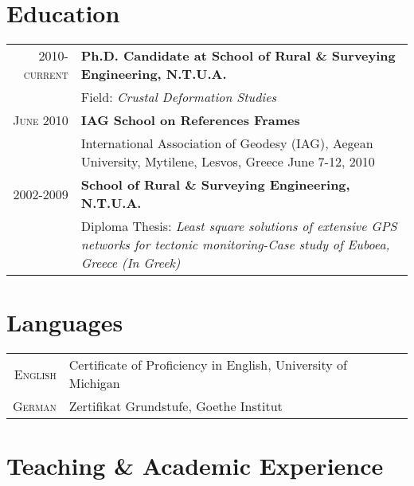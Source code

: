 \documentclass[9pt]{extarticle} %
\begin{document}
\section{Education}
\begin{tabular}{rp{13cm}}
%
  \textsc{2010-current} &\textbf{Ph.D. Candidate at School of Rural \& Surveying Engineering, N.T.U.A.}\\
   & Field: \textit{Crustal Deformation Studies}\\
%
  \textsc{June 2010} & \textbf{IAG School on References Frames}\\
    & International Association of Geodesy \small{(IAG)}, Aegean University, Mytilene, Lesvos, Greece June 7-12, 2010\\
%
  \textsc{2002-2009} & \textbf{School of Rural \& Surveying Engineering, N.T.U.A.}\\
  & Diploma Thesis: 
  \textit{Least square solutions of extensive GPS networks for tectonic monitoring-Case study of Euboea, Greece (In Greek)}\\
%
\end{tabular}
\medskip

\section{Languages}
\begin{tabular}{rp{13cm}}

\textsc{English} & Certificate of Proficiency in English, University of Michigan \\
\textsc{German} & Zertifikat Grundstufe, Goethe Institut\\

\end{tabular}
\medskip

\section{Teaching \& Academic Experience}
\end{document}
